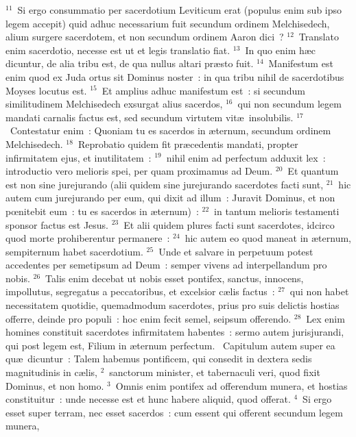 ${}^{11}$~Si ergo consummatio per sacerdotium Leviticum erat (populus enim sub ipso legem accepit) quid adhuc necessarium fuit secundum ordinem Melchisedech, alium surgere sacerdotem, et non secundum ordinem Aaron dici~?
${}^{12}$~Translato enim sacerdotio, necesse est ut et legis translatio fiat.
${}^{13}$~In quo enim h\ae c dicuntur, de alia tribu est, de qua nullus altari pr\ae sto fuit.
${}^{14}$~Manifestum est enim quod ex Juda ortus sit Dominus noster~: in qua tribu nihil de sacerdotibus Moyses locutus est.
${}^{15}$~Et amplius adhuc manifestum est~: si secundum similitudinem Melchisedech exsurgat alius sacerdos,
${}^{16}$~qui non secundum legem mandati carnalis factus est, sed secundum virtutem vit\ae\ insolubilis.
${}^{17}$~Contestatur enim~: Quoniam tu es sacerdos in \ae ternum, secundum ordinem Melchisedech.
${}^{18}$~Reprobatio quidem fit pr\ae cedentis mandati, propter infirmitatem ejus, et inutilitatem~:
${}^{19}$~nihil enim ad perfectum adduxit lex~: introductio vero melioris spei, per quam proximamus ad Deum.
${}^{20}$~Et quantum est non sine jurejurando (alii quidem sine jurejurando sacerdotes facti sunt,
${}^{21}$~hic autem cum jurejurando per eum, qui dixit ad illum~: Juravit Dominus, et non pœnitebit eum~: tu es sacerdos in \ae ternum)~:
${}^{22}$~in tantum melioris testamenti sponsor factus est Jesus.
${}^{23}$~Et alii quidem plures facti sunt sacerdotes, idcirco quod morte prohiberentur permanere~:
${}^{24}$~hic autem eo quod maneat in \ae ternum, sempiternum habet sacerdotium.
${}^{25}$~Unde et salvare in perpetuum potest accedentes per semetipsum ad Deum~: semper vivens ad interpellandum pro nobis.
${}^{26}$~Talis enim decebat ut nobis esset pontifex, sanctus, innocens, impollutus, segregatus a peccatoribus, et excelsior c\ae lis factus~:
${}^{27}$~qui non habet necessitatem quotidie, quemadmodum sacerdotes, prius pro suis delictis hostias offerre, deinde pro populi~: hoc enim fecit semel, seipsum offerendo.
${}^{28}$~Lex enim homines constituit sacerdotes infirmitatem habentes~: sermo autem jurisjurandi, qui post legem est, Filium in \ae ternum perfectum.
~Capitulum autem super ea qu\ae\ dicuntur~: Talem habemus pontificem, qui consedit in dextera sedis magnitudinis in c\ae lis,
${}^{2}$~sanctorum minister, et tabernaculi veri, quod fixit Dominus, et non homo.
${}^{3}$~Omnis enim pontifex ad offerendum munera, et hostias constituitur~: unde necesse est et hunc habere aliquid, quod offerat.
${}^{4}$~Si ergo esset super terram, nec esset sacerdos~: cum essent qui offerent secundum legem munera,
